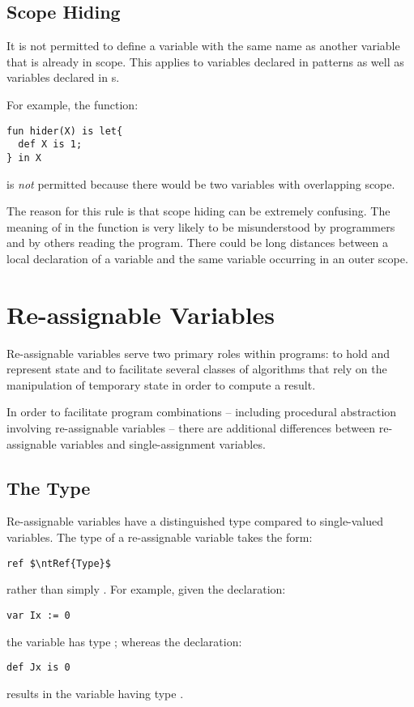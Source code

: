 \subsection{Scope Hiding}
\label{scopeHiding}
It is not permitted to define a variable with the same name as another variable that is already in scope. This applies to variables declared in patterns as well as variables declared in s.

For example, the function:
\begin{lstlisting}
fun hider(X) is let{
  def X is 1;
} in X
\end{lstlisting}
is \emph{not} permitted because there would be two  variables with overlapping scope.
\begin{aside}
The reason for this rule is that scope hiding can be extremely confusing. The meaning of  in the  function is very likely to be misunderstood by programmers and by others reading the program. There could be long distances between a local declaration of a variable and the same variable occurring in an outer scope.
\end{aside}

\section{Re-assignable Variables}
\label{reassignableVars}

Re-assignable variables serve two primary roles within programs: to hold and represent state and to facilitate several classes of algorithms that rely on the manipulation of temporary state in order to compute a result.

In order to facilitate program combinations -- including procedural abstraction involving re-assignable variables -- there are additional differences between re-assignable variables and single-assignment variables.

\subsection{The  Type}
\label{refType}
Re-assignable variables have a distinguished type compared to single-valued variables. The type of a re-assignable variable takes the form:
\begin{lstlisting}[mathescape=true]
ref $\ntRef{Type}$
\end{lstlisting}
rather than simply . For example, given the declaration:
\begin{lstlisting}
var Ix := 0
\end{lstlisting}
the variable  has type ; whereas the declaration:
\begin{lstlisting}
def Jx is 0
\end{lstlisting}
results in the variable  having type .

